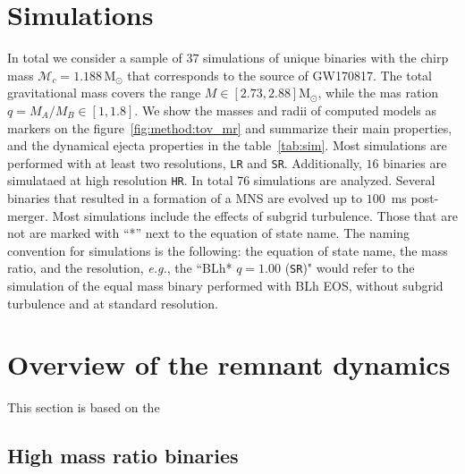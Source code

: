 \documentclass[11pt,a4paper,headinclude=true,DIV=14,BCOR=8mm,chapterprefix,listof=totoc,twoside,openright,abstracton]{scrbook}
\def\Msun{{\text{M}_{\odot}}}
\newcommand{\GW}{GW170817}
\newcommand{\eg}{\textit{e.g.}}
\newcommand{\pmerg}{post-merger}
\begin{document}
\section{Simulations}






In total we consider a sample of $37$ simulations of unique binaries with the 
chirp mass $\mathcal{M}_c = 1.188\,\Msun$ that corresponds to the source of \GW{}.
The total gravitational mass covers the range $M\in[2.73, 2.88]\Msun$, while the 
mas ration $q=M_A/M_B\in[1,1.8]$. 
We show the masses and radii of computed models as markers on the 
figure~\ref{fig:method:tov_mr} and summarize their main properties, 
and the dynamical ejecta properties in the table~\ref{tab:sim}.
Most simulations are performed with at least two resolutions, 
\texttt{LR} and \texttt{SR}. 
Additionally, $16$ binaries are simulataed at high resolution \texttt{HR}.
In total $76$ simulations are analyzed.
Several binaries that resulted in a formation of a MNS are evolved up to 
$100$~ms \pmerg.
Most simulations include the effects of subgrid turbulence. 
Those that are not are marked with ``*'' next to the equation of state name.
The naming convention for simulations is the following: 
the equation of state name, the mass ratio, and the resolution, \eg, 
the ``BLh* $q=1.00$ (\texttt{SR})" would refer to the simulation of the equal mass
binary performed with BLh EOS, without subgrid turbulence and at standard resolution. 



\section{Overview of the remnant dynamics}
\label{sec:bns_dynsmics_overview}


This section is based on the \cite{Nedora:2020pak}

\subsection{High mass ratio binaries}
\end{document}
